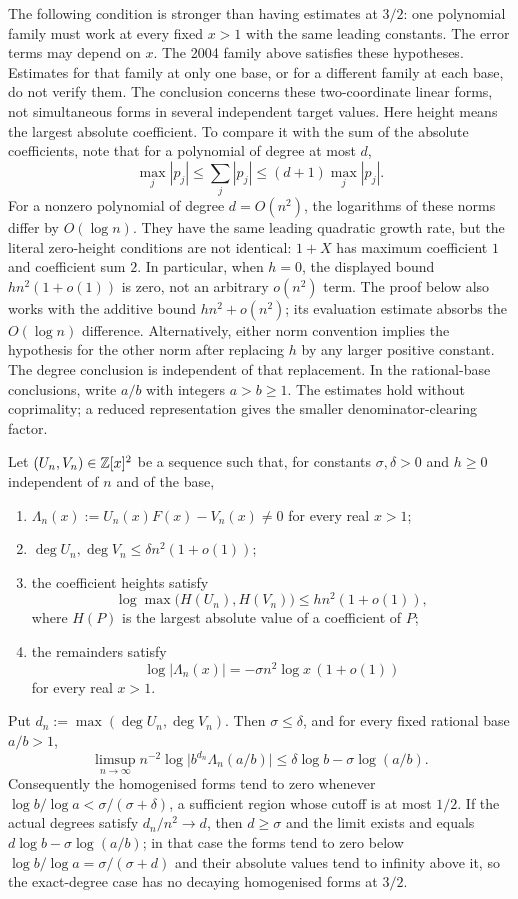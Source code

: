 \documentclass[11pt]{article}
\begin{document}
The following condition is stronger than having estimates at $3/2$:
one polynomial family must work at every fixed $x>1$ with the same
leading constants. The error terms may depend on $x$. The 2004 family
above satisfies these hypotheses. Estimates for that family at only one
base, or for a different family at each base, do not verify them.
The conclusion concerns
these two-coordinate linear forms, not simultaneous forms in several
independent target values. Here height means the largest absolute
coefficient. To compare it with the sum of the absolute coefficients,
note that for a polynomial of degree at most $d$,
\[
 \max_j|p_j|\le\sum_j|p_j|\le(d+1)\max_j|p_j|.
\]
For a nonzero polynomial of degree $d=O(n^2)$, the logarithms of
these norms differ by $O(\log n)$. They have the same leading
quadratic growth rate, but the literal zero-height conditions are
not identical: $1+X$ has maximum coefficient $1$ and coefficient sum
$2$. In particular, when $h=0$, the displayed bound
$hn^2(1+o(1))$ is zero, not an arbitrary $o(n^2)$ term.
The proof below also works with the additive bound $hn^2+o(n^2)$;
its evaluation estimate absorbs the $O(\log n)$ difference.
Alternatively, either norm convention implies the hypothesis for the
other norm after replacing $h$ by any larger positive constant.
The degree conclusion is independent of that replacement.
In the rational-base conclusions, write $a/b$ with integers $a>b\ge1$.
The estimates hold without coprimality; a reduced representation gives
the smaller denominator-clearing factor.

\begin{theorem}\label{long1049:res:archcap}
Let $(U_n,V_n)\in\mathbb{Z}[x]^{2}$ be a sequence such that, for constants
$\sigma,\delta>0$ and $h\ge0$ independent of $n$ and of the base,
\begin{enumerate}
\item $\Lambda_n(x):=U_n(x)F(x)-V_n(x)\ne0$ for every real $x>1$;
\item $\deg U_n,\deg V_n\le\delta n^{2}(1+o(1))$;
\item the coefficient heights satisfy
\[
 \log\max\bigl(H(U_n),H(V_n)\bigr)\le hn^{2}(1+o(1)),
\]
where $H(P)$ is the
largest absolute value of a coefficient of $P$;
\item the remainders satisfy
\[
 \log|\Lambda_n(x)|=-\sigma n^{2}\log x\,(1+o(1))
\]
for every real $x>1$.
\end{enumerate}
Put $d_n:=\max(\deg U_n,\deg V_n)$.  Then $\sigma\le\delta$, and for every fixed
rational base $a/b>1$,
\[
 \limsup_{n\to\infty}n^{-2}\log\bigl|b^{d_n}\Lambda_n(a/b)\bigr|
 \le\delta\log b-\sigma\log(a/b).
\]
Consequently the homogenised forms tend to zero whenever
$\log b/\log a<\sigma/(\sigma+\delta)$, a sufficient region whose cutoff is at
most $1/2$.  If the actual degrees satisfy $d_n/n^{2}\to d$, then $d\ge\sigma$
and the limit exists and equals $d\log b-\sigma\log(a/b)$; in that case the
forms tend to zero below $\log b/\log a=\sigma/(\sigma+d)$ and their absolute
values tend to infinity above it, so the exact-degree case has no decaying
homogenised forms at $3/2$.
\end{theorem}
\end{document}
